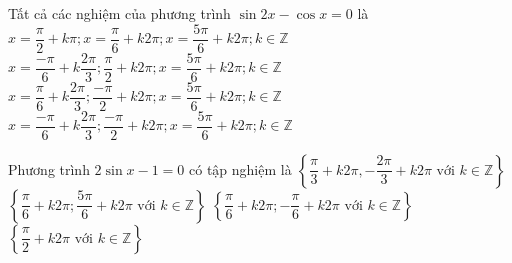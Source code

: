 \begin{ex}%
	Tất cả các nghiệm của  phương trình $\sin 2x-\cos x=0$ là
	 \choice
		 {\True $x=\dfrac{\pi}{2}+k\pi;x=\dfrac{\pi}{6}+k2\pi;x=\dfrac{5\pi}{6}+k2\pi;k\in \mathbb{Z}$}
		{$x=\dfrac{-\pi}{6}+k\dfrac{2\pi}{3};\dfrac{\pi}{2}+k2\pi;x=\dfrac{5\pi}{6}+k2\pi;k\in \mathbb{Z}$} 
		{$x=\dfrac{\pi}{6}+k\dfrac{2\pi}{3};\dfrac{-\pi}{2}+k2\pi;x=\dfrac{5\pi}{6}+k2\pi;k\in \mathbb{Z}$} 
		{$x=\dfrac{-\pi}{6}+k\dfrac{2\pi}{3};\dfrac{-\pi}{2}+k2\pi;x=\dfrac{5\pi}{6}+k2\pi;k\in  \mathbb{Z}$}
\end{ex}

\begin{ex}%
	Phương trình $2\sin x -1=0$  có tập nghiệm là
	\choice 
		{$\left\{\dfrac{\pi}3+k 2\pi,-\dfrac{2\pi}3+k 2\pi\text{ với  } k\in\mathbb{Z}\right\}$}
		{\True $\left\{\dfrac{\pi}6+k 2\pi;\dfrac{5\pi}6+k 2\pi  \text{ với } k\in\mathbb{Z}\right\}$}
		{$\left\{\dfrac{\pi}6+k 2\pi;-\dfrac{\pi}6+k 2\pi\text{ với  } k\in\mathbb{Z}\right\}$}
		{$\left\{\dfrac{\pi}2+k 2\pi\text{ với  } k\in\mathbb{Z}\right\}$}
\end{ex}

